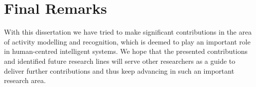\section{Final Remarks}
\label{sec:conclusions:final}

With this dissertation we have tried to make significant contributions in the area of activity modelling and recognition, which is deemed to play an important role in human-centred intelligent systems. We hope that the presented contributions and identified future research lines will serve other researchers as a guide to deliver further contributions and thus keep advancing in such an important research area.